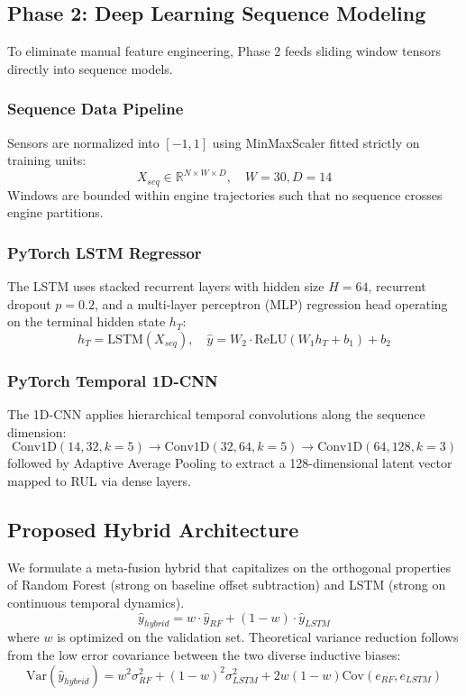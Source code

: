 \documentclass[conference]{IEEEtran}
\begin{document}
\subsection{Phase 2: Deep Learning Sequence Modeling}
To eliminate manual feature engineering, Phase 2 feeds sliding window tensors directly into sequence models.
\subsubsection{Sequence Data Pipeline}
Sensors are normalized into $[-1, 1]$ using MinMaxScaler fitted strictly on training units:
\begin{equation}
X_{seq} \in \mathbb{R}^{N \times W \times D}, \quad W = 30, D = 14
\end{equation}
Windows are bounded within engine trajectories such that no sequence crosses engine partitions.

\subsubsection{PyTorch LSTM Regressor}
The LSTM uses stacked recurrent layers with hidden size $H=64$, recurrent dropout $p=0.2$, and a multi-layer perceptron (MLP) regression head operating on the terminal hidden state $h_T$:
\begin{equation}
h_T = \text{LSTM}(X_{seq}), \quad \hat{y} = W_2 \cdot \text{ReLU}(W_1 h_T + b_1) + b_2
\end{equation}

\subsubsection{PyTorch Temporal 1D-CNN}
The 1D-CNN applies hierarchical temporal convolutions along the sequence dimension:
\begin{equation}
\text{Conv1D}(14, 32, k=5) \rightarrow \text{Conv1D}(32, 64, k=5) \rightarrow \text{Conv1D}(64, 128, k=3)
\end{equation}
followed by Adaptive Average Pooling to extract a 128-dimensional latent vector mapped to RUL via dense layers.

\subsection{Proposed Hybrid Architecture}
We formulate a meta-fusion hybrid that capitalizes on the orthogonal properties of Random Forest (strong on baseline offset subtraction) and LSTM (strong on continuous temporal dynamics).
\begin{equation}
\hat{y}_{hybrid} = w \cdot \hat{y}_{RF} + (1 - w) \cdot \hat{y}_{LSTM}
\end{equation}
where $w$ is optimized on the validation set. Theoretical variance reduction follows from the low error covariance between the two diverse inductive biases:
\begin{equation}
\text{Var}(\hat{y}_{hybrid}) = w^2 \sigma_{RF}^2 + (1-w)^2 \sigma_{LSTM}^2 + 2w(1-w)\text{Cov}(e_{RF}, e_{LSTM})
\end{equation}
\end{document}
